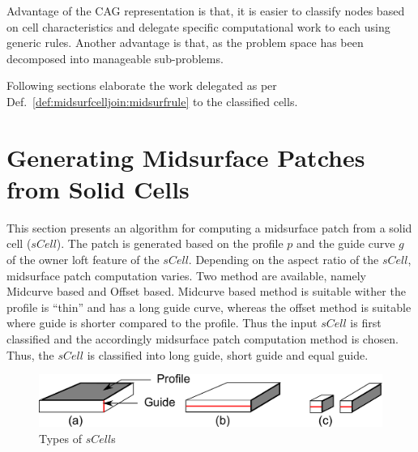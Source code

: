 Advantage of the CAG representation is that, it is easier to classify nodes based on cell characteristics and delegate specific computational work to each using generic rules.  Another advantage is that, as the problem space has been decomposed into manageable sub-problems. 

Following sections elaborate the work delegated as per Def.~\ref{def:midsurfcelljoin:midsurfrule} to the classified cells.

\section{Generating Midsurface Patches from Solid Cells}
\label{sec:midsurfcelljoin:scell}

This section presents an algorithm for computing a midsurface patch from a solid cell ($sCell$). The patch is generated based on the profile $p$ and the guide curve $g$  of the owner loft feature of the $sCell$. Depending on the aspect ratio of the $sCell$, midsurface patch computation varies. Two method are available, namely Midcurve based and Offset based. Midcurve based method is suitable wither the profile is ``thin'' and has a long guide curve, whereas the offset method is suitable where guide is shorter compared to the profile. Thus the input $sCell$ is first classified and the accordingly midsurface patch computation method is chosen. Thus, the $sCell$ is classified into long guide, short guide and equal guide.


  \begin{figure}[!h]
\centering     %
\includegraphics[width=0.75\linewidth,valign=t]{../Common/images/typesofscell_1.pdf}
\caption{Types of $sCell$s}
\label{fig:midsurfcelljoin:typesofscell}
\end{figure}


